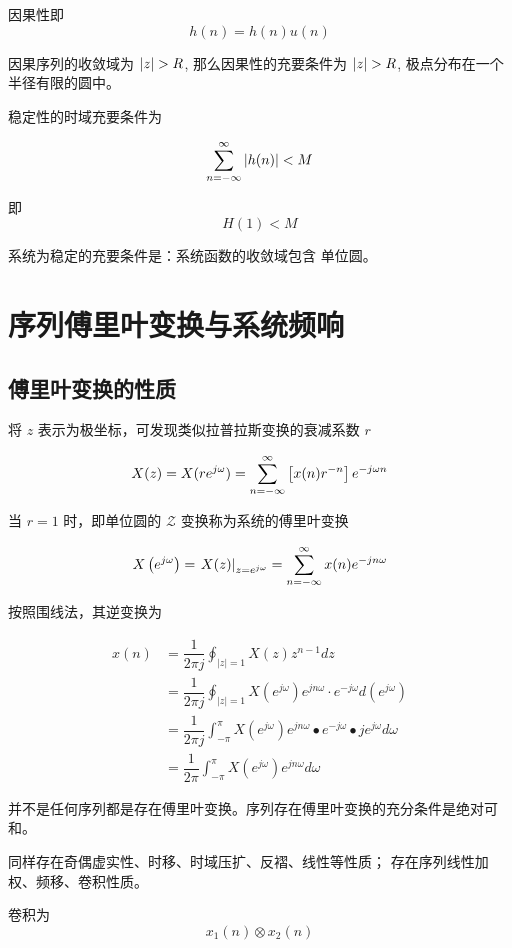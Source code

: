 \documentclass[cn,11pt,chinese,black,simple]{../elegantbook}
\begin{document}
因果性即 \[h(n) = h(n) u(n)\]

因果序列的收敛域为 \(\left| z \right| > R\), 那么因果性的充要条件为  \(\left| z \right| > R\), 极点分布在一个半径有限的圆中。

稳定性的时域充要条件为 

\[\displaystyle\sum_{n=-\infty}^{\infty}| h ( n )|< M\]

即 \[H(1) < M\]

系统为稳定的充要条件是：系统函数的收敛域包含
单位圆。

\section{序列傅里叶变换与系统频响}

\subsection{傅里叶变换的性质}

将 \(z\) 表示为极坐标，可发现类似拉普拉斯变换的衰减系数 \(r\)

\[X(z) = X(r e^{j \omega}) = \displaystyle\sum_{n=-\infty}^{\infty}\left[x(n)r^{-n}\right]e^{-j \omega n}\]

当 \(r = 1\) 时，即单位圆的 \(\mathscr{Z}\) 变换称为系统的傅里叶变换

\[X\left(e^{ j \omega}\right)=\left.X(z)\right|_{z=e^{j \omega}}=\displaystyle\sum_{n=-\infty}^{\infty} x(n) e^{- j n \omega}\]

按照围线法，其逆变换为 

\[\begin{aligned}
    x(n) &=\dfrac{1}{2 \pi j } \oint_{|z|=1} X(z) z^{n-1} d z \\
    &=\dfrac{1}{2 \pi j } \oint_{|z|=1} X\left(e^{ j \omega}\right) e^{ j n \omega} \cdot e^{- j \omega} d \left(e^{ j \omega}\right) \\
    &=\dfrac{1}{2 \pi j } \int_{-\pi}^{\pi} X\left(e^{ j \omega}\right) e^{ j n \omega} \bullet e^{- j \omega} \bullet j e^{ j \omega} d \omega\\
    &=\dfrac{1}{2 \pi} \int_{-\pi}^{\pi} X\left(e^{ j \omega}\right) e^{j n \omega} d \omega
\end{aligned}\]

并不是任何序列都是存在傅里叶变换。序列存在傅里叶变换的充分条件是绝对可和。

同样存在奇偶虚实性、时移、时域压扩、反褶、线性等性质；
存在序列线性加权、频移、卷积性质。

卷积为 \[x_1(n) \otimes x_2(n) \]
\end{document}

